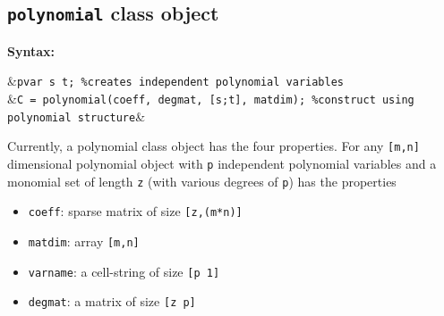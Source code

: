 \documentclass{article}
\begin{document}
	\subsection{\texttt{polynomial} class object} \label{subsec:polynomial-classdef}

	\textbf{Syntax:}
		\begin{flalign*}
			&\texttt{pvar s t; \%creates independent polynomial variables}\\
			&\texttt{C = polynomial(coeff, degmat, [s;t], matdim); \%construct using polynomial structure}&
		\end{flalign*}


	Currently, a polynomial class object has the four properties. For any \texttt{[m,n]} dimensional polynomial object with \texttt{p} independent polynomial variables and a monomial set of length \texttt{z} (with various degrees of \texttt{p}) has the properties
	\begin{itemize}
		\item \texttt{coeff}: sparse matrix of size \texttt{[z,(m*n)]}
		\item \texttt{matdim}: array \texttt{[m,n]}
		\item \texttt{varname}: a cell-string of size \texttt{[p 1]}
		\item \texttt{degmat}: a matrix of size \texttt{[z p]}
	\end{itemize}
	
\end{document}
